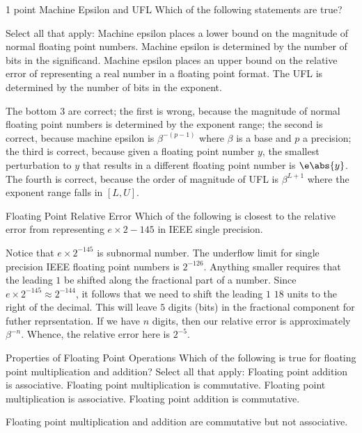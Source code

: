 \documentclass[../main.tex]{subfiles}
\begin{document}
1 point
Machine Epsilon and UFL
Which of the following statements are true?

Select all that apply:
Machine epsilon places a lower bound on the magnitude of normal floating point numbers.
Machine epsilon is determined by the number of bits in the significand.
Machine epsilon places an upper bound on the relative error of representing a real number in a floating point format.
The UFL is determined by the number of bits in the exponent.

\begin{solution}
    The bottom $3$ are correct; the first is wrong, because the magnitude of normal floating point numbers is determined by the exponent range; the second is correct, because machine epsilon is $\beta^{-(p-1)}$ where $\beta$ is a base and $p$ a precision; the third is correct, because given a floating point number $y$, the smallest perturbation to $y$ that results in a different floating point number is $\e \abs{y}$. The fourth is correct, because the order of magnitude of UFL is $\beta^{L+1}$ where the exponent range falls in $\left[ L,U \right]$.
\end{solution}

Floating Point Relative Error
Which of the following is closest to the relative error from representing $e×2−145$ in IEEE single precision.

\begin{solution}
    Notice that $e \times 2^{-145}$ is subnormal number. The underflow limit for single precision IEEE floating point numbers is $2^{-126}$. Anything smaller requires that the leading $1$ be shifted along the fractional part of a number. Since $e \times 2^{-145} \approx 2^{-144}$, it follows that we need to shift the leading $1$ $18$ units to the right of the decimal. This will leave $5$ digits (bits) in the fractional component for futher reprsentation. If we have $n$ digits, then our relative error is approximately $\beta^{-n}$. Whence, the relative error here is $2^{-5}$.
\end{solution}

Properties of Floating Point Operations
Which of the following is true for floating point multiplication and addition?
Select all that apply:
Floating point addition is associative.
Floating point multiplication is commutative.
Floating point multiplication is associative.
Floating point addition is commutative.
\begin{solution}
    Floating point multiplication and addition are commutative but not associative.
\end{solution}
\end{document}
